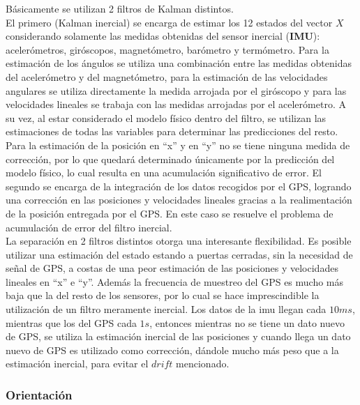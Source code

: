 \documentclass[main]{subfiles}
\begin{document}
Básicamente se utilizan 2 filtros de Kalman distintos.\\
El primero (Kalman inercial) se encarga de estimar los 12 estados del vector $X$ considerando solamente las medidas obtenidas del sensor inercial (\textbf{IMU}): acelerómetros, giróscopos, magnetómetro, barómetro y termómetro. Para la estimación de los ángulos se utiliza una combinación entre las medidas obtenidas del acelerómetro y del magnetómetro, para la estimación de las velocidades angulares se utiliza directamente la medida arrojada por el giróscopo y para las velocidades lineales se trabaja con las medidas arrojadas por el acelerómetro. A su vez, al estar considerado el modelo físico dentro del filtro, se utilizan las estimaciones de todas las variables para determinar las predicciones del resto. Para la estimación de la posición en ``x'' y en ``y'' no se tiene ninguna medida de corrección, por lo que quedará determinado únicamente por la predicción del modelo físico, lo cual resulta en una acumulación significativo de error.
El segundo se encarga de la integración de los datos recogidos por el GPS, logrando una corrección en las posiciones y velocidades lineales gracias a la realimentación de la posición entregada por el GPS. En este caso se resuelve el problema de acumulación de error del filtro inercial.\\

La separación en 2 filtros distintos otorga una interesante flexibilidad. Es posible utilizar una estimación del estado estando a puertas cerradas, sin la necesidad de señal de GPS, a costas de una peor estimación de las posiciones y velocidades lineales en ``x'' e ``y''. Además la frecuencia de muestreo del GPS es mucho más baja que la del resto de los sensores, por lo cual se hace imprescindible la utilización de un filtro meramente inercial. Los datos de la imu llegan cada $10ms$, mientras que los del GPS cada $1s$, entonces mientras no se tiene un dato nuevo de GPS, se utiliza la estimación inercial de las posiciones y cuando llega un dato nuevo de GPS es utilizado como corrección, dándole mucho más peso que a la estimación inercial, para evitar el $drift$ mencionado.

\subsubsection*{Orientación}
\end{document}
